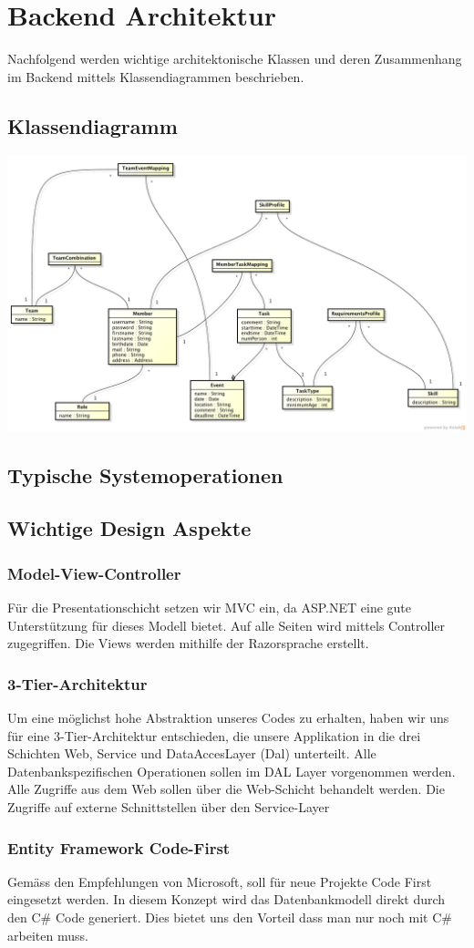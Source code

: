 \chapter{Backend Architektur}
	Nachfolgend werden wichtige architektonische Klassen und deren Zusammenhang im Backend mittels Klassendiagrammen beschrieben.

	\section{Klassendiagramm}
	\includegraphics[width=\textwidth]{content/architekturdokumentation/images/datenmodell.png}
	
	\section{Typische Systemoperationen}

	\section{Wichtige Design Aspekte}
		\subsection{Model-View-Controller}
		Für die Presentationschicht setzen wir MVC ein, da ASP.NET eine gute Unterstützung für dieses Modell bietet. Auf alle Seiten wird mittels Controller zugegriffen. Die Views werden mithilfe der Razorsprache erstellt.

		\subsection{3-Tier-Architektur}
		Um eine möglichst hohe Abstraktion unseres Codes zu erhalten, haben wir uns für eine 3-Tier-Architektur entschieden, die unsere Applikation in die drei Schichten Web, Service und DataAccesLayer (Dal) unterteilt. Alle Datenbankspezifischen Operationen sollen im DAL Layer vorgenommen werden. Alle Zugriffe aus dem Web sollen über die Web-Schicht behandelt werden. Die Zugriffe auf externe Schnittstellen über den Service-Layer

		\subsection{Entity Framework Code-First}
		Gemäss den Empfehlungen von Microsoft, soll für neue Projekte Code First eingesetzt werden. In diesem Konzept wird das Datenbankmodell direkt durch den C\# Code generiert. Dies bietet uns den Vorteil dass man nur noch mit C\# arbeiten muss.